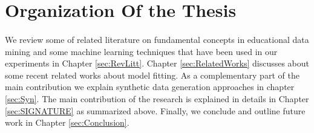 \section{Organization Of the Thesis}
\paragraph{} We review some of related literature on fundamental concepts in educational data mining and some machine learning techniques that have been used in our experiments in Chapter \ref{sec:RevLitt}. Chapter \ref{sec:RelatedWorks} discusses about some recent related works about model fitting. As a complementary part of the main contribution we explain synthetic data generation approaches in chapter \ref{sec:Syn}. The main contribution of the research is explained in details in Chapter \ref{sec:SIGNATURE} as summarized above. Finally, we conclude and outline future work in Chapter \ref{sec:Conclusion}. 


